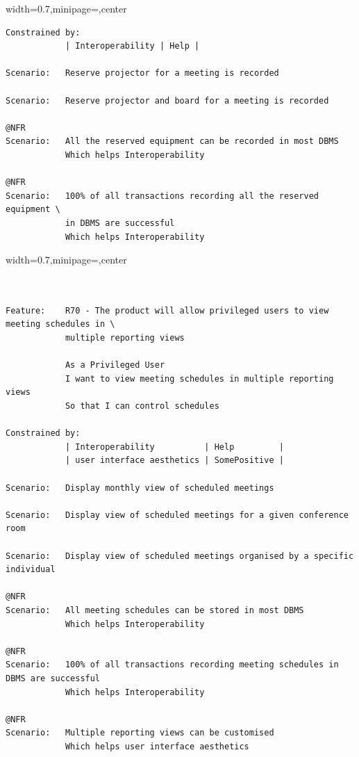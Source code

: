 \documentclass[dissertation,final]{softeng}
\newenvironment{featurecode}[1]
{ \lrbox\featurebox \begin{adjustbox}{width=#1\textwidth,minipage=\textwidth,center} }
{ \end{adjustbox}\endlrbox}
\newenvironment{featurelist}[2]
{
\newcommand{\setcaption}{\caption{#1}}
\newcommand{\setlabel}{\label{#2}}
}
{\begin{listing}[h!]\centering\usebox\featurebox\setcaption\setlabel\end{listing}}
\begin{document}
\begin{appendices}
\begin{featurelist}{R68 -- The product shall record all the equipment that has been reserved}{lst:feature_r68}
\begin{featurecode}{0.7}
\begin{verbatim}
Constrained by:
            | Interoperability | Help |

Scenario:   Reserve projector for a meeting is recorded

Scenario:   Reserve projector and board for a meeting is recorded	

@NFR	
Scenario:   All the reserved equipment can be recorded in most DBMS
            Which helps Interoperability

@NFR	
Scenario:   100% of all transactions recording all the reserved equipment \
            in DBMS are successful
            Which helps Interoperability
\end{verbatim}
\end{featurecode}
\end{featurelist}

\begin{featurelist}{R70 -- The product will allow privileged users to view meeting schedules}{lst:feature_r70}
\begin{featurecode}{0.7}
\begin{verbatim}


Feature:    R70 - The product will allow privileged users to view meeting schedules in \ 
            multiple reporting views

            As a Privileged User
            I want to view meeting schedules in multiple reporting views
            So that I can control schedules
	
Constrained by:
            | Interoperability          | Help         |
            | user interface aesthetics | SomePositive |

Scenario:   Display monthly view of scheduled meetings

Scenario:   Display view of scheduled meetings for a given conference room

Scenario:   Display view of scheduled meetings organised by a specific individual
	
@NFR	
Scenario:   All meeting schedules can be stored in most DBMS
            Which helps Interoperability

@NFR
Scenario:   100% of all transactions recording meeting schedules in DBMS are successful
            Which helps Interoperability

@NFR
Scenario:   Multiple reporting views can be customised
            Which helps user interface aesthetics
\end{verbatim}
\end{featurecode}
\end{featurelist}
\clearpage


\end{appendices}
\end{document}
